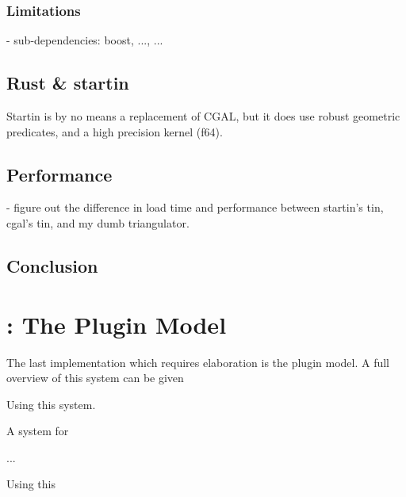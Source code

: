 \subsubsection{Limitations}

\begin{note}
- sub-dependencies: boost, ..., ...
\end{note}
  
\subsection{Rust \& startin}

\begin{note}
Startin is by no means a replacement of CGAL, 
but it does use robust geometric predicates, and a high precision kernel (f64).
\end{note}

\subsection{Performance}
- figure out the difference in load time and performance between startin's tin, cgal's tin, and my dumb triangulator.

\subsection{Conclusion}


\newpage

\section{\mySubRQThreeTitle: The Plugin Model}
\label{sec:impl-plugin}

The last implementation which requires elaboration is the plugin model. 
A full overview of this system can be given 



Using this system. 



A system for 

...

Using this 


